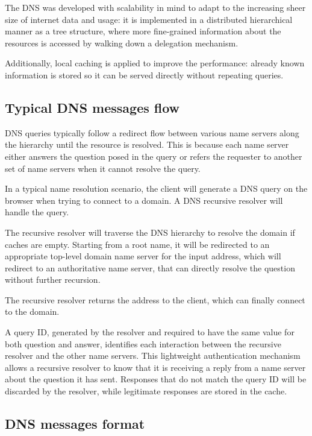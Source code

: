 \documentclass[11pt,a4paper]{article}
\begin{document}
\hfill \break
\noindent
The DNS was developed with scalability in mind to adapt to the increasing sheer size of internet data and usage: it is implemented in a distributed hierarchical manner as a tree structure, where
more fine-grained information about the resources is accessed by walking down a delegation mechanism.

\noindent
Additionally, local caching is applied to improve the performance: already known information is stored so it can be served directly without repeating queries.

\subsection{Typical DNS messages flow}
DNS queries typically follow a redirect flow between various name servers along the hierarchy
until the resource is resolved. This is because each name server either answers the question
posed in the query or refers the requester to another set of name servers when it cannot
resolve the query.

\hfill \break
\noindent
In a typical name resolution scenario, the client will generate a DNS query on the browser
when trying to connect to a domain. A DNS recursive resolver will handle the query.

\noindent
The recursive resolver will traverse the DNS hierarchy to resolve
the domain if caches are empty. Starting from a root name, it will be redirected to an appropriate top-level domain
name server for the input address, which will redirect to an authoritative name server, that can directly resolve the question without further recursion.

\noindent
The recursive resolver returns the address to the client, which can finally connect to the
domain.

\hfill \break
\noindent
A query ID, generated by the resolver and required to have the same value for both question and answer, identifies each interaction between the recursive resolver and the other name servers. This lightweight authentication mechanism allows a
recursive resolver to know that it is receiving a reply from a name server about the
question it has sent. Responses that do not match the query ID will be discarded by the resolver,
while legitimate responses are stored in the cache.

\subsection{DNS messages format}
\end{document}
